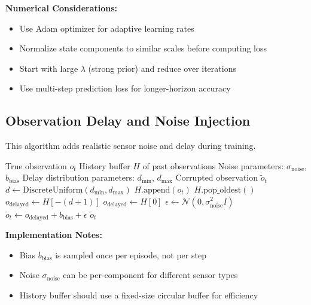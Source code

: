 \textbf{Numerical Considerations:}
\begin{itemize}
    \item Use Adam optimizer for adaptive learning rates
    \item Normalize state components to similar scales before computing loss
    \item Start with large $\lambda$ (strong prior) and reduce over iterations
    \item Use multi-step prediction loss for longer-horizon accuracy
\end{itemize}

\subsection{Observation Delay and Noise Injection}

This algorithm adds realistic sensor noise and delay during training.

\begin{algorithm}[H]
\caption{Observation Noise and Delay Injection}
\label{alg:obs_noise_delay}
\begin{algorithmic}[1]
\REQUIRE True observation $o_t$
\REQUIRE History buffer $H$ of past observations
\REQUIRE Noise parameters: $\sigma_{\text{noise}}$, $b_{\text{bias}}$
\REQUIRE Delay distribution parameters: $d_{\min}$, $d_{\max}$
\ENSURE Corrupted observation $\tilde{o}_t$
\STATE {}
    \STATE $d \gets \text{DiscreteUniform}(d_{\min}, d_{\max})$
\ENDIF
\STATE
\STATE {}
\STATE $H.\text{append}(o_t)$
    \STATE $H.\text{pop\_oldest}()$
\ENDIF
\STATE
\STATE {}
    \STATE $o_{\text{delayed}} \gets H[-(d+1)]$
\ELSE
    \STATE $o_{\text{delayed}} \gets H[0]$ 
\ENDIF
\STATE
\STATE {}
\STATE $\epsilon \gets \mathcal{N}(0, \sigma_{\text{noise}}^2 I)$
\STATE $\tilde{o}_t \gets o_{\text{delayed}} + b_{\text{bias}} + \epsilon$
\RETURN $\tilde{o}_t$
\end{algorithmic}
\end{algorithm}

\textbf{Implementation Notes:}
\begin{itemize}
    \item Bias $b_{\text{bias}}$ is sampled once per episode, not per step
    \item Noise $\sigma_{\text{noise}}$ can be per-component for different sensor types
    \item History buffer should use a fixed-size circular buffer for efficiency
\end{itemize}

